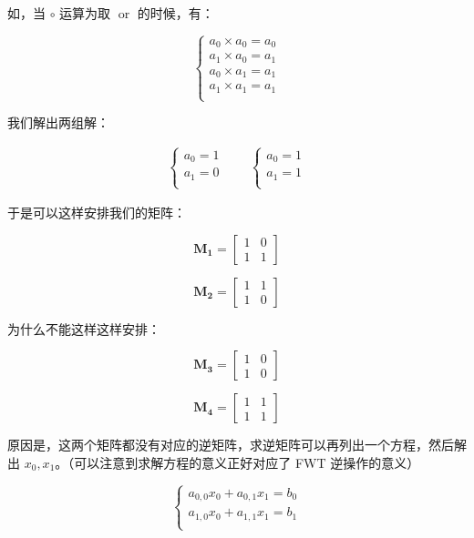 \documentclass{article}
\begin{document}
如，当 $\circ$ 运算为取 $\operatorname{or}$ 的时候，有：

$$
\begin{cases}
	a_{0} \times a_{0}=a_{0} \\
	a_{1} \times a_{0}=a_{1} \\
	a_{0} \times a_{1}=a_{1} \\
	a_{1} \times a_{1}=a_{1} \\
\end{cases}
$$

我们解出两组解：

$$
\begin{aligned}
    \begin{cases}
        a_{0} =1 \\
        a_{1} =0 \\
	\end{cases}
	\qquad
    \begin{cases}
        a_{0} =1 \\
        a_{1} =1 \\
    \end{cases}
\end{aligned}
$$

于是可以这样安排我们的矩阵：

$$\mathbf{M_1}=\begin{bmatrix} 1 & 0 \\ 1 & 1 \end{bmatrix}$$

$$\mathbf{M_2}=\begin{bmatrix} 1 & 1 \\ 1 & 0 \end{bmatrix}$$

为什么不能这样这样安排：

$$\mathbf{M_3}=\begin{bmatrix} 1 & 0 \\ 1 & 0 \end{bmatrix}$$

$$\mathbf{M_4}=\begin{bmatrix} 1 & 1 \\ 1 & 1 \end{bmatrix}$$

原因是，这两个矩阵都没有对应的逆矩阵，求逆矩阵可以再列出一个方程，然后解出 $x_0,x_1$。（可以注意到求解方程的意义正好对应了 FWT 逆操作的意义）

$$
\begin{cases}
    a_{0,0}x_0 + a_{0,1}x_1 =b_0 \\
    a_{1,0}x_0 + a_{1,1}x_1 =b_1 \\
\end{cases}
$$
\end{document}
